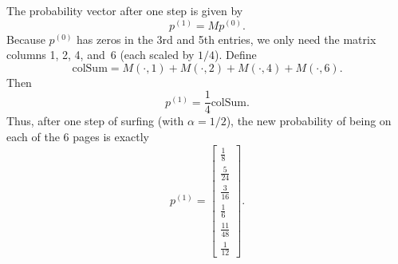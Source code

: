 \documentclass{article}
\begin{document}
The probability vector after one step is given by
$$
    p^{(1)} = M p^{(0)}.
$$
Because $p^{(0)}$ has zeros in the 3rd and 5th entries, we only need the matrix columns 1, 2, 4, and~6 (each scaled by $1/4$).  Define
$$
    \text{colSum} = M(\cdot,1) + M(\cdot,2) + M(\cdot,4) + M(\cdot,6).
$$
Then
$$
    p^{(1)}
    =
    \frac{1}{4}\text{colSum}.
$$
Thus, after one step of surfing (with $\alpha=1/2$), the new probability of being on each of the 6 pages is exactly
$$
    \boxed{
        p^{(1)}
        =
        \begin{bmatrix}
            \tfrac{1}{8}   \\[3pt]
            \tfrac{5}{24}  \\[3pt]
            \tfrac{3}{16}  \\[3pt]
            \tfrac{1}{6}   \\[3pt]
            \tfrac{11}{48} \\[3pt]
            \tfrac{1}{12}
        \end{bmatrix}.
    }
$$
\end{document}
